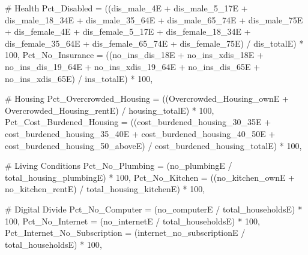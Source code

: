 \documentclass[
  letterpaper,
  DIV=11,
  numbers=noendperiod]{scrreprt}
\newenvironment{Shaded}{\begin{snugshade}}{\end{snugshade}}
\newcommand{\AttributeTok}[1]{\textcolor[rgb]{0.40,0.45,0.13}{#1}}
\newcommand{\CommentTok}[1]{\textcolor[rgb]{0.37,0.37,0.37}{#1}}
\newcommand{\DecValTok}[1]{\textcolor[rgb]{0.68,0.00,0.00}{#1}}
\newcommand{\NormalTok}[1]{\textcolor[rgb]{0.00,0.23,0.31}{#1}}
\newcommand{\SpecialCharTok}[1]{\textcolor[rgb]{0.37,0.37,0.37}{#1}}
\begin{document}
\begin{Shaded}
\begin{Highlighting}[]
    \CommentTok{\# Health}
    \AttributeTok{Pct\_Disabled =}\NormalTok{ ((dis\_male\_4E }\SpecialCharTok{+}\NormalTok{ dis\_male\_5\_17E }\SpecialCharTok{+}\NormalTok{ dis\_male\_18\_34E }\SpecialCharTok{+}\NormalTok{ dis\_male\_35\_64E }\SpecialCharTok{+} 
\NormalTok{                     dis\_male\_65\_74E }\SpecialCharTok{+}\NormalTok{ dis\_male\_75E }\SpecialCharTok{+}\NormalTok{ dis\_female\_4E }\SpecialCharTok{+}\NormalTok{ dis\_female\_5\_17E }\SpecialCharTok{+} 
\NormalTok{                     dis\_female\_18\_34E }\SpecialCharTok{+}\NormalTok{ dis\_female\_35\_64E }\SpecialCharTok{+}\NormalTok{ dis\_female\_65\_74E }\SpecialCharTok{+} 
\NormalTok{                     dis\_female\_75E) }\SpecialCharTok{/}\NormalTok{ dis\_totalE) }\SpecialCharTok{*} \DecValTok{100}\NormalTok{,}
    \AttributeTok{Pct\_No\_Insurance =}\NormalTok{ ((no\_ins\_dis\_18E }\SpecialCharTok{+}\NormalTok{ no\_ins\_xdis\_18E }\SpecialCharTok{+}\NormalTok{ no\_ins\_dis\_19\_64E }\SpecialCharTok{+} 
\NormalTok{                         no\_ins\_xdis\_19\_64E }\SpecialCharTok{+}\NormalTok{ no\_ins\_dis\_65E }\SpecialCharTok{+}\NormalTok{ no\_ins\_xdis\_65E) }\SpecialCharTok{/}\NormalTok{ ins\_totalE) }\SpecialCharTok{*} \DecValTok{100}\NormalTok{,}
    
    \CommentTok{\# Housing}
    \AttributeTok{Pct\_Overcrowded\_Housing =}\NormalTok{ ((Overcrowded\_Housing\_ownE }\SpecialCharTok{+}\NormalTok{ Overcrowded\_Housing\_rentE) }\SpecialCharTok{/}\NormalTok{ housing\_totalE) }\SpecialCharTok{*} \DecValTok{100}\NormalTok{,}
    \AttributeTok{Pct\_Cost\_Burdened\_Housing =}\NormalTok{ ((cost\_burdened\_housing\_30\_35E }\SpecialCharTok{+}\NormalTok{ cost\_burdened\_housing\_35\_40E }\SpecialCharTok{+} 
\NormalTok{                                  cost\_burdened\_housing\_40\_50E }\SpecialCharTok{+}\NormalTok{ cost\_burdened\_housing\_50\_aboveE) }\SpecialCharTok{/} 
\NormalTok{                                  cost\_burdened\_housing\_totalE) }\SpecialCharTok{*} \DecValTok{100}\NormalTok{,}
    
    \CommentTok{\# Living Conditions}
    \AttributeTok{Pct\_No\_Plumbing =}\NormalTok{ (no\_plumbingE }\SpecialCharTok{/}\NormalTok{ total\_housing\_plumbingE) }\SpecialCharTok{*} \DecValTok{100}\NormalTok{,}
    \AttributeTok{Pct\_No\_Kitchen =}\NormalTok{ ((no\_kitchen\_ownE }\SpecialCharTok{+}\NormalTok{ no\_kitchen\_rentE) }\SpecialCharTok{/}\NormalTok{ total\_housing\_kitchenE) }\SpecialCharTok{*} \DecValTok{100}\NormalTok{,}
    
    \CommentTok{\# Digital Divide}
    \AttributeTok{Pct\_No\_Computer =}\NormalTok{ (no\_computerE }\SpecialCharTok{/}\NormalTok{ total\_householdsE) }\SpecialCharTok{*} \DecValTok{100}\NormalTok{,}
    \AttributeTok{Pct\_No\_Internet =}\NormalTok{ (no\_internetE }\SpecialCharTok{/}\NormalTok{ total\_householdsE) }\SpecialCharTok{*} \DecValTok{100}\NormalTok{,}
    \AttributeTok{Pct\_Internet\_No\_Subscription =}\NormalTok{ (internet\_no\_subscriptionE }\SpecialCharTok{/}\NormalTok{ total\_householdsE) }\SpecialCharTok{*} \DecValTok{100}\NormalTok{,}
    

\end{Highlighting}
\end{Shaded}
\end{document}
